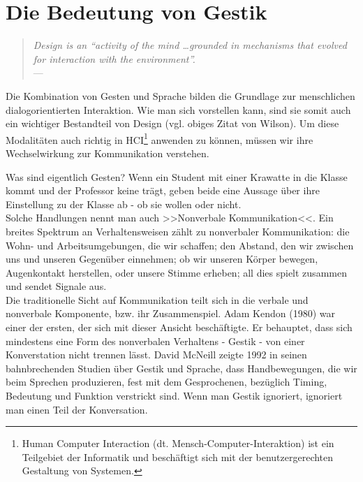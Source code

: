 \section{Die Bedeutung von Gestik}

\begin{quote}
	\begin{flushright}{\slshape    
	    Design is an “activity of the mind \ldots grounded in mechanisms that evolved for interaction with the environment”.} \\ \medskip
	    ---  \citep{Wilson:2002}
	\end{flushright}
\end{quote}

Die Kombination von Gesten und Sprache bilden die Grundlage zur menschlichen dialogorientierten Interaktion. Wie man sich vorstellen kann, sind sie somit auch ein wichtiger Bestandteil von Design (vgl. obiges Zitat von Wilson). Um diese Modalitäten auch richtig in HCI\footnote{Human Computer Interaction (dt. Mensch-Computer-Interaktion) ist ein Teilgebiet der Informatik und beschäftigt sich mit der benutzergerechten Gestaltung von Systemen.} anwenden zu können, müssen wir ihre Wechselwirkung zur Kommunikation verstehen.

\medskip Was sind eigentlich Gesten? Wenn ein Student mit einer Krawatte in die Klasse kommt und der Professor keine trägt, geben beide eine Aussage über ihre Einstellung zu der Klasse ab - ob sie wollen oder nicht. \\ Solche Handlungen nennt man auch >>Nonverbale Kommunikation<<. Ein breites Spektrum an Verhaltensweisen zählt zu nonverbaler Kommunikation: die Wohn- und Arbeitsumgebungen, die wir schaffen; den Abstand, den wir zwischen uns und unseren Gegenüber einnehmen; ob wir unseren Körper bewegen, Augenkontakt herstellen, oder unsere Stimme erheben; all dies spielt zusammen und sendet Signale aus. \\
Die traditionelle Sicht auf Kommunikation teilt sich in die verbale und nonverbale Komponente, bzw. ihr Zusammenspiel. Adam Kendon (1980) war einer der ersten, der sich mit dieser Ansicht beschäftigte. Er behauptet, dass sich mindestens eine Form des nonverbalen Verhaltens - Gestik - von einer Konverstation nicht trennen lässt. David McNeill zeigte 1992 in seinen bahnbrechenden Studien über Gestik und Sprache, dass Handbewegungen, die wir beim Sprechen produzieren, fest mit dem Gesprochenen, bezüglich Timing, Bedeutung und Funktion verstrickt sind. Wenn man Gestik ignoriert, ignoriert man einen Teil der Konversation.

